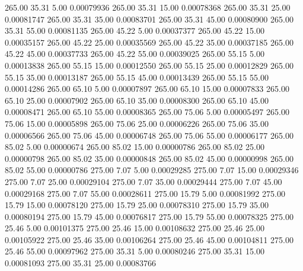     265.00     35.31      5.00     0.00079936
    265.00     35.31     15.00     0.00078368
    265.00     35.31     25.00     0.00081747
    265.00     35.31     35.00     0.00083701
    265.00     35.31     45.00     0.00080900
    265.00     35.31     55.00     0.00081135
    265.00     45.22      5.00     0.00037377
    265.00     45.22     15.00     0.00035157
    265.00     45.22     25.00     0.00035569
    265.00     45.22     35.00     0.00037185
    265.00     45.22     45.00     0.00037733
    265.00     45.22     55.00     0.00039025
    265.00     55.15      5.00     0.00013838
    265.00     55.15     15.00     0.00012550
    265.00     55.15     25.00     0.00012829
    265.00     55.15     35.00     0.00013187
    265.00     55.15     45.00     0.00013439
    265.00     55.15     55.00     0.00014286
    265.00     65.10      5.00     0.00007897
    265.00     65.10     15.00     0.00007833
    265.00     65.10     25.00     0.00007902
    265.00     65.10     35.00     0.00008300
    265.00     65.10     45.00     0.00008471
    265.00     65.10     55.00     0.00008365
    265.00     75.06      5.00     0.00005497
    265.00     75.06     15.00     0.00005898
    265.00     75.06     25.00     0.00006226
    265.00     75.06     35.00     0.00006566
    265.00     75.06     45.00     0.00006748
    265.00     75.06     55.00     0.00006177
    265.00     85.02      5.00     0.00000674
    265.00     85.02     15.00     0.00000786
    265.00     85.02     25.00     0.00000798
    265.00     85.02     35.00     0.00000848
    265.00     85.02     45.00     0.00000998
    265.00     85.02     55.00     0.00000786
    275.00      7.07      5.00     0.00029285
    275.00      7.07     15.00     0.00029346
    275.00      7.07     25.00     0.00029104
    275.00      7.07     35.00     0.00029444
    275.00      7.07     45.00     0.00029168
    275.00      7.07     55.00     0.00028611
    275.00     15.79      5.00     0.00081992
    275.00     15.79     15.00     0.00078120
    275.00     15.79     25.00     0.00078310
    275.00     15.79     35.00     0.00080194
    275.00     15.79     45.00     0.00076817
    275.00     15.79     55.00     0.00078325
    275.00     25.46      5.00     0.00101375
    275.00     25.46     15.00     0.00108632
    275.00     25.46     25.00     0.00105922
    275.00     25.46     35.00     0.00106264
    275.00     25.46     45.00     0.00104811
    275.00     25.46     55.00     0.00097962
    275.00     35.31      5.00     0.00080246
    275.00     35.31     15.00     0.00081093
    275.00     35.31     25.00     0.00083766
